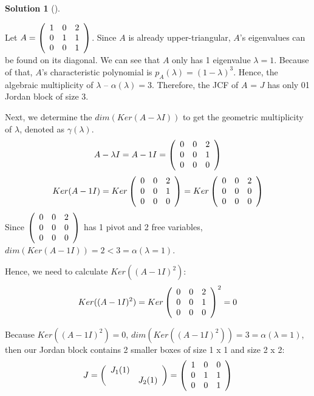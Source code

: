 \documentclass[numbers=enddot,12pt,final,onecolumn,notitlepage]{scrartcl}
\newcounter{sol}
\theoremstyle{definition}
\newtheorem{solu}[sol]{Solution}
\newenvironment{solution}[1][]
{\begin{solu}[#1]\begin{leftbar}}
        {\end{leftbar}\end{solu}}
\begin{document}
\begin{solution}
	Let $A = \left(\begin{array}
				[c]{ccc}
				1 & 0 & 2 \\
				0 & 1 & 1 \\
				0 & 0 & 1
			\end{array}\right)$. Since $A$ is already upper-triangular, $A$'s eigenvalues can be found on its diagonal. We can see that $A$ only has 1 eigenvalue $\lambda = 1$. Because of that, $A$'s characteristic polynomial is $p_A(\lambda) = (1 - \lambda)^{3}$. Hence, the algebraic multiplicity of $\lambda$ -- $\alpha(\lambda) = 3$. Therefore, the JCF of $A$ = $J$ has only 01 Jordan block of size 3.

	Next, we determine the $dim(Ker(A - \lambda I))$ to get the geometric multiplicity of $\lambda$, denoted as $\gamma(\lambda)$.
	\[
		A - \lambda I = A - 1 I =
		\left(\begin{array}
				[c]{ccc}
				0 & 0 & 2 \\
				0 & 0 & 1 \\
				0 & 0 & 0
			\end{array}\right)
	\]
	\[
		Ker(A - 1 I) = Ker
		\left(\begin{array}
				[c]{ccc}
				0 & 0 & 2 \\
				0 & 0 & 1 \\
				0 & 0 & 0
			\end{array}\right) = Ker
		\left(\begin{array}
				[c]{ccc}
				0 & 0 & 2 \\
				0 & 0 & 0 \\
				0 & 0 & 0
			\end{array}\right)
	\]
	Since $\left(\begin{array}
				[c]{ccc}
				0 & 0 & 2 \\
				0 & 0 & 0 \\
				0 & 0 & 0
			\end{array}\right)$ has 1 pivot and 2 free variables, $dim(Ker(A - 1 I)) = 2 < 3 = \alpha(\lambda=1)$.

	Hence, we need to calculate $Ker((A - 1 I)^2)$:
	\[
		Ker((A - 1 I)^2) = Ker
		\left(\begin{array}
				[c]{ccc}
				0 & 0 & 2 \\
				0 & 0 & 1 \\
				0 & 0 & 0
			\end{array}\right)^2 = 0
	\]

	Because $Ker((A - 1 I)^2) = 0$, $dim(Ker((A - 1 I)^2)) = 3 = \alpha(\lambda=1)$, then our Jordan block contains 2 smaller boxes of size 1 x 1 and size 2 x 2:
	\[
		J = \left(\begin{array}
				[c]{cc}
				J_1(1)   & \text{ } \\
				\text{ } & J_2(1)
			\end{array}\right) =
		\left(\begin{array}
				[c]{ccc}
				1 & 0 & 0 \\
				0 & 1 & 1 \\
				0 & 0 & 1
			\end{array}\right)
	\]


\end{solution}
\end{document}
